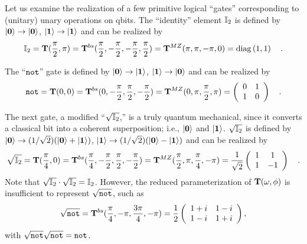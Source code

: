 \documentclass[pra,preprint,showpacs,showkeys,amsfonts]{revtex4}
\begin{document}
Let us examine the realization of a few primitive logical ``gates''
corresponding to (unitary) unary operations on qbits.
The ``identity'' element ${\Bbb I}_2$ is defined by
$\vert  {\bf 0}  \rangle  \rightarrow  \vert  {\bf 0}  \rangle $,
$\vert  {\bf 1}  \rangle  \rightarrow  \vert  {\bf 1}  \rangle $ and can be realized by
\begin{equation}
{\Bbb I}_2 =
{\bf T}({\pi \over 2},\pi)=
{\bf T}^{bs}({\pi \over 2},-{\pi \over 2},-{\pi \over 2},{\pi \over 2})=
{\bf T}^{MZ}(\pi ,\pi ,-\pi ,0)
={\rm diag}
\left( 1,1
\right)
\quad .
\end{equation}

The ``${\tt not}$'' gate is defined by
$\vert  {\bf 0}  \rangle  \rightarrow  \vert  {\bf 1}  \rangle $,
$\vert  {\bf 1}  \rangle  \rightarrow  \vert  {\bf 0}  \rangle $ and can be realized by
\begin{equation}
{\tt not} =
{\bf T}(0,0)=
{\bf T}^{bs}(0,-{\pi \over 2},{\pi \over 2},-{\pi \over 2})=
{\bf T}^{MZ}(0,\pi ,{\pi \over 2} ,\pi )
=
\left(
\begin{array}{cc}
0&1
\\
1&0
 \end{array}
\right)
\quad .
\end{equation}


The next gate, a modified ``$\sqrt{{\Bbb I}_2}$,'' is a truly quantum
mechanical, since it converts a classical bit
into
a coherent superposition; i.e., $\vert  {\bf 0}  \rangle $ and $\vert  {\bf 1}  \rangle $.
$\sqrt{{\Bbb I}_2}$ is defined by
$\vert  {\bf 0}  \rangle  \rightarrow  (1/\sqrt{2})(\vert  {\bf 0}  \rangle  + \vert  {\bf 1}  \rangle )$,
$\vert  {\bf 1}  \rangle  \rightarrow  (1/\sqrt{2})(\vert  {\bf 0}  \rangle  - \vert  {\bf 1}  \rangle )$ and can
be realized by
\begin{equation}
\sqrt{{\Bbb I}_2} =
{\bf T}({\pi \over 4},0)=
{\bf T}^{bs}({\pi \over 4},-{\pi \over 2},{\pi \over 2},-{\pi \over 2})=
{\bf T}^{MZ}({\pi \over 2},\pi ,{\pi \over 4} ,-\pi )
=
{1 \over \sqrt{2}}
\left(
\begin{array}{cc}
1&1
\\
1&-1
 \end{array}
\right)
\quad .
\end{equation}
Note that $\sqrt{{\Bbb I}_2}\cdot \sqrt{{\Bbb I}_2} = {\Bbb I}_2$.
However, the reduced parameterization of ${\bf T}(\omega,\phi)$
is insufficient to represent $\sqrt{{\tt not}}$, such as
\begin{equation}
\sqrt{{\tt not}} =
{\bf T}^{bs}({\pi \over 4},-\pi ,
{3\pi \over 4},
-\pi )=
{1 \over 2}
\left(
\begin{array}{cc}
1+i&1-i
\\
1-i&1+i
 \end{array}
\right)
,
\end{equation}
with
$
\sqrt{{\tt not}}
\sqrt{{\tt not}} = {\tt not}$.
\end{document}
